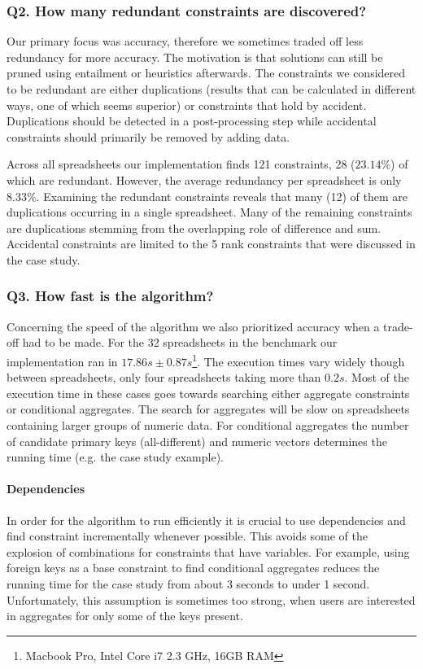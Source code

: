 \documentclass{ecai}
\begin{document}
\subsubsection*{Q2. How many redundant constraints are discovered?}
Our primary focus was accuracy, therefore we sometimes traded off less redundancy for more accuracy.
The motivation is that solutions can still be pruned using entailment or heuristics afterwards.
The constraints we considered to be redundant are either duplications (results that can be calculated in different ways, one of which seems superior) or constraints that hold by accident.
Duplications should be detected in a post-processing step while accidental constraints should primarily be removed by adding data.

Across all spreadsheets our implementation finds 121 constraints, 28 ($23.14\%$) of which are redundant.
However, the average redundancy per spreadsheet is only $8.33\%$.
Examining the redundant constraints reveals that many (12) of them are duplications occurring in a single spreadsheet.
Many of the remaining constraints are duplications stemming from the overlapping role of difference and sum.
Accidental constraints are limited to the 5 rank constraints that were discussed in the case study.

\subsubsection*{Q3. How fast is the algorithm?}
Concerning the speed of the algorithm we also prioritized accuracy when a trade-off had to be made.
For the 32 spreadsheets in the benchmark our implementation ran in $17.86s \pm 0.87s$\footnote{Macbook Pro, Intel Core i7 2.3 GHz, 16GB RAM}.
The execution times vary widely though between spreadsheets, only four spreadsheets taking more than $0.2s$.
Most of the execution time in these cases goes towards searching either aggregate constraints or conditional aggregates.
The search for aggregates will be slow on spreadsheets containing larger groups of numeric data.
For conditional aggregates the number of candidate primary keys (all-different) and numeric vectors determines the running time (e.g. the case study example).

\paragraph{Dependencies}
In order for the algorithm to run efficiently it is crucial to use dependencies and find constraint incrementally whenever possible.
This avoids some of the explosion of combinations for constraints that have variables.
For example, using foreign keys as a base constraint to find conditional aggregates reduces the running time for the case study from about 3 seconds to under 1 second.
Unfortunately, this assumption is sometimes too strong, when users are interested in aggregates for only some of the keys present.
\end{document}
